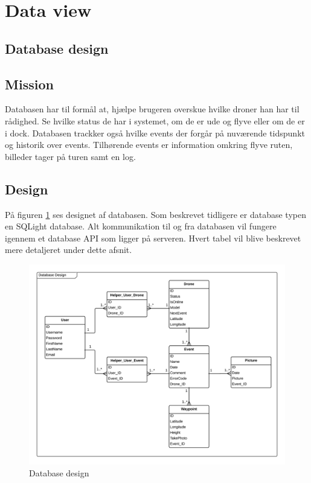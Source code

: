 \section{Data view}

\subsection{Database design}

\subsection{Mission}
Databasen har til formål at, hjælpe brugeren overskue hvilke droner han har til rådighed. Se hvilke status de har i systemet, om de er ude og flyve eller om de er i dock. Databasen trackker også hvilke events der forgår på nuværende tidspunkt og historik over events. Tilhørende events er information omkring flyve ruten, billeder tager på turen samt en log.

\subsection{Design}
På figuren \ref{fig:database_design} ses designet af databasen. Som beskrevet tidligere er database typen en SQLight database. Alt kommunikation til og fra databasen vil fungere igennem et database API som ligger på serveren. Hvert tabel vil blive beskrevet mere detaljeret under dette afsnit.

\vspace{-5pt}
\begin{figure}[H]
	\centering
	\includegraphics[width=1\textwidth]{Billeder/database/database_design.png}
	\vspace{-5pt}
	\caption{Database design}
	\label{fig:database_design}
\end{figure}

